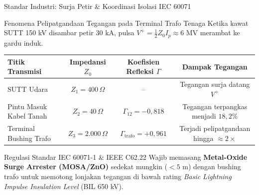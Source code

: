 \documentclass[aspectratio=169,10pt]{beamer}
\begin{document}
\begin{frame}{Standar Industri: Surja Petir \& Koordinasi Isolasi IEC 60071}
  \begin{block}{Fenomena Pelipatgandaan Tegangan pada Terminal Trafo Tenaga}
    Ketika kawat SUTT 150 kV disambar petir $30\text{ kA}$, pulsa $V^+ = \frac{1}{2} Z_0 I_p \approx 6\text{ MV}$ merambat ke gardu induk.
  \end{block}
  \vspace{0.1cm}
  \begin{table}[h]
    \centering
    \scriptsize
    \begin{tabular}{lccc}
      \toprule
      \textbf{Titik Transmisi} & \textbf{Impedansi $Z_0$} & \textbf{Koefisien Refleksi $\Gamma$} & \textbf{Dampak Tegangan} \\
      \midrule
      SUTT Udara & $Z_1 = 400\,\Omega$ & -- & Tegangan surja datang $V^+$ \\
      Pintu Masuk Kabel Tanah & $Z_2 = 40\,\Omega$ & $\Gamma_{12} = -0{,}818$ & Tegangan terpangkas menjadi $18{,}2\%$ \\
      Terminal Bushing Trafo & $Z_3 = 2.000\,\Omega$ & $\Gamma_{\text{trafo}} = +0{,}961$ & Terjadi pelipatgandaan hingga $\approx 2 \times$ \\
      \bottomrule
    \end{tabular}
  \end{table}
  \begin{exampleblock}{Regulasi Standar IEC 60071-1 \& IEEE C62.22}
    \small
    Wajib memasang \textbf{Metal-Oxide Surge Arrester (MOSA/ZnO)} sedekat mungkin ($< 5\text{ m}$) dengan bushing trafo untuk memotong lonjakan tegangan di bawah rating \textit{Basic Lightning Impulse Insulation Level} (BIL 650 kV).
  \end{exampleblock}
\end{frame}
\end{document}
